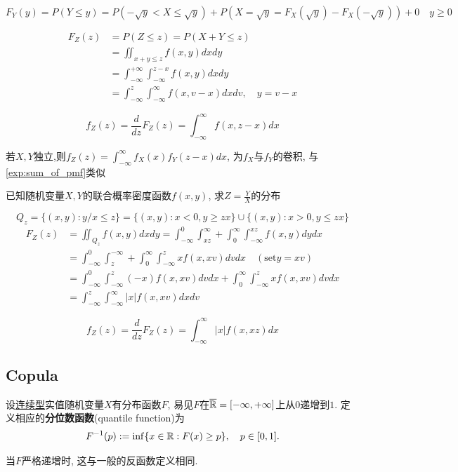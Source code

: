\begin{solution}
    \[ F_Y(y)=P(Y\le y)=P(-\sqrt{y}<X\le \sqrt{y})+P(X=\sqrt{y}=F_X(\sqrt{y})-F_X(-\sqrt{y}))+0 \quad y\ge 0\]

    \begin{align*}
        F_Z(z) & =P(Z\le z)=P(X+Y\le z)                                               \\
               & =\iint _{x+y\leqslant z}f(x,y)dxdy                                   \\
               & =\int_{-\infty}^{+\infty}\int_{-\infty}^{z-x}f(x,y)dxdy              \\
               & =\int_{-\infty}^{z}\int_{-\infty}^{\infty}f(x,v-x)dxdv, \quad y= v-x
    \end{align*}

    \[ f_Z(z)=\frac{d}{dz}F_Z(z)=\int_{-\infty}^{\infty}f(x,z-x)dx \]

    若$X,Y$独立,则$f_Z(z)=\int_{-\infty}^{\infty}f_X(x)f_Y(z-x)dx$, 为$f_X$与$f_Y$的卷积, 与\ref{exp:sum_of_pmf}类似
\end{solution}

\begin{example}
    已知随机变量$X,Y$的联合概率密度函数$f(x,y)$, 求$Z=\frac{Y}{X}$的分布
\end{example}

\begin{solution}
    \[ Q_{z}=\{(x, y): y / x \leq z\}=\{(x, y): x<0, y \geq z x\} \cup\{(x, y): x>0, y \leq z x\} \]
    \begin{align*}
        F_{Z}(z) & =\iint_{Q_{z}} f(x, y) d x d y=\int_{-\infty}^{0} \int_{x z}^{\infty}+\int_{0}^{\infty} \int_{-\infty}^{x z} f(x, y) d y d x \\
                 & =\int_{-\infty}^{0} \int_{z}^{-\infty}+\int_{0}^{\infty} \int_{-\infty}^{z} x f(x, x v) d v d x \quad(\text{set} y=x v)      \\
                 & =\int_{-\infty}^{0} \int_{-\infty}^{z}(-x) f(x, x v) d v d x+\int_{0}^{\infty} \int_{-\infty}^{z} x f(x, xv) dvdx            \\
                 & =\int_{-\infty}^{z} \int_{-\infty}^{\infty}|x| f(x, xv) dxdv
    \end{align*}

    \[ f_Z(z)=\frac{d}{dz}F_Z(z)=\int_{-\infty}^{\infty}|x|f(x,xz)dx \]
\end{solution}

\subsection{Copula}\label{subsec:Copula}
\begin{definition}
    设\underline{连续型}实值随机变量$X$有分布函数$F$, 易见$F$在$\overline{\mathbb{R}}=[-\infty,+\infty]$上从$0$递增到$1$. 定义相应的\textbf{分位数函数}(quantile function)为
    \[ F^{-1}(p) := \inf\{x\in\mathbb{R}:F(x)\ge p\}, \quad p \in [0,1]. \]
\end{definition}
\begin{remark}
    当$F$严格递增时, 这与一般的反函数定义相同.
\end{remark}

